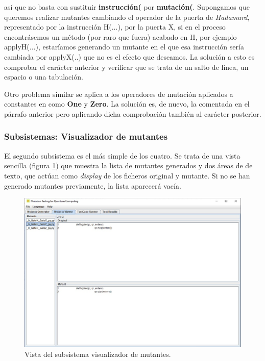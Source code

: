 así que no basta con sustituir \textbf{instrucción(} por \textbf{mutación(}. Supongamos que queremos realizar mutantes cambiando el operador de la puerta de \textit{Hadamard}, representado por la instrucción H(...), por la puerta X, si en el proceso encontrásemos un método (por raro que fuera) acabado en H, por ejemplo applyH(...), estaríamos generando un mutante en el que esa instrucción sería cambiada por applyX(..) que no es el efecto que deseamos. La solución a esto es comprobar el carácter anterior y verificar que se trata de un salto de línea, un espacio o una tabulación.

Otro problema similar se aplica a los operadores de mutación aplicados a constantes en \qsh como \textbf{One} y \textbf{Zero}. La solución es, de nuevo, la comentada en el párrafo anterior pero aplicando dicha comprobación también al carácter posterior.

\subsubsection{Subsistemas: Visualizador de mutantes}

El segundo subsistema es el más simple de los cuatro. Se trata de una vista sencilla (figura \ref{fig:vista2}) que muestra la lista de mutantes generados y dos áreas de de texto, que actúan como \textit{display} de los ficheros original y mutante. Si no se han generado mutantes previamente, la lista aparecerá vacía.

\begin{figure}[htb]
\begin{center}
\includegraphics[scale=0.45]{images/vista2}
\end{center}
\caption{Vista del subsistema visualizador de mutantes.}
\label{fig:vista2}
\end{figure}

